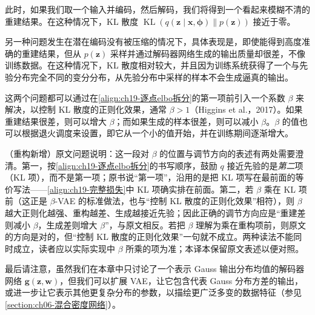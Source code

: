 \documentclass[../../main.tex]{subfiles}
\begin{document}
此时，如果我们取一个输入并编码，然后解码，我们将得到一个看起来模糊不清的重建结果。在这种情况下，KL 散度 $\operatorname{KL}(q(\bm{z}\mid\bm{x},\bm{\phi})\|p(\bm{z}))$ 接近于零。

另一种问题发生在潜在编码没有被压缩的情况下，具体表现是，即使能得到高度准确的重建结果，但从 $p(\bm{z})$ 采样并通过解码器网络生成的输出质量却很差，不像训练数据。在这种情况下，KL 散度相对较大，并且因为训练系统获得了一个与先验分布完全不同的变分分布，从先验分布中采样的样本不会生成逼真的输出。

这两个问题都可以通过在\eqref{align:ch19-逐点elbo拆分}的第一项前引入一个系数 $\beta$ 来解决，以控制 KL 散度的正则化效果，通常 $\beta>1$（Higgins et al.，2017）。如果重建结果很差，则可以增大 $\beta$；而如果生成的样本很差，则可以减小 $\beta$。$\beta$ 的值也可以根据退火调度来设置，即它从一个小的值开始，并在训练期间逐渐增大。

\begin{remark}（重构新增）原文问题说明：这一段对 $\beta$ 的位置与调节方向的表述有两处需要澄清。第一，按\eqref{align:ch19-逐点elbo拆分}的书写顺序，鼓励 $q$ 接近先验的是\emph{第二}项（KL 项），而不是第一项；原书说“第一项”，沿用的是把 KL 项写在最前面的等价写法——\eqref{align:ch19-完整损失}中 KL 项确实排在前面。第二，若 $\beta$ 乘在 KL 项前（这正是 $\beta$-VAE 的标准做法，也与“控制 KL 散度的正则化效果”相符），则 $\beta$ 越大正则化越强、重构越差、生成越接近先验；因此正确的调节方向应是“重建差则减小 $\beta$，生成差则增大 $\beta$”，与原文相反。若把 $\beta$ 理解为乘在重构项前，则原文的方向是对的，但“控制 KL 散度的正则化效果”一句就不成立。两种读法不能同时成立，读者应以实际实现中 $\beta$ 所乘的项为准；本译本保留原文表述以便对照。
\end{remark}

最后请注意，虽然我们在本章中只讨论了一个表示 Gauss 输出分布均值的解码器网络 $\bm{g}(\bm{z},\bm{w})$，但我们可以扩展 VAE，让它包含代表 Gauss 分布方差的输出，或进一步让它表示其他更复杂分布的参数，以描绘更广泛多变的数据特征（参见\cref{section:ch06-混合密度网络}）。
\end{document}
